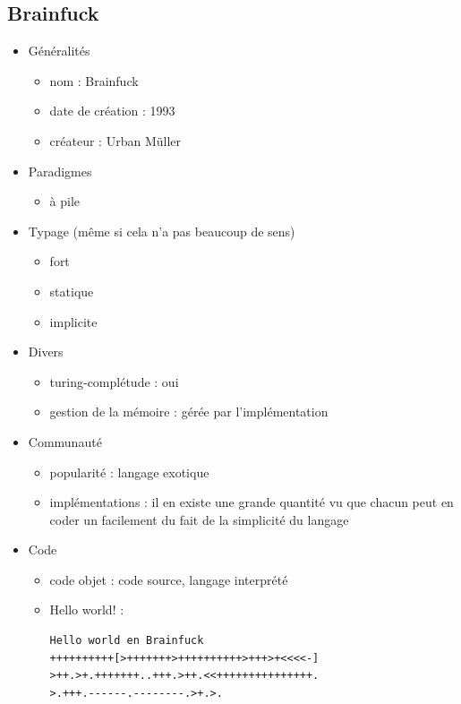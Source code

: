 \newpage

\subsection{Brainfuck}

\renewcommand{\labelitemi}{\textbullet}
\begin{itemize}
\item Généralités
	\begin{itemize}
	\item nom : Brainfuck
	\item date de création : 1993
	\item créateur : Urban Müller\\
	\end{itemize}
\item Paradigmes
	\begin{itemize}
	\item à pile\\
	\end{itemize}
\item Typage (même si cela n'a pas beaucoup de sens)
	\begin{itemize}
	\item fort
	\item statique
	\item implicite\\
	\end{itemize}
\item Divers
	\begin{itemize}
	\item turing-complétude : oui
	\item gestion de la mémoire : gérée par l'implémentation\\
	\end{itemize}
\item Communauté
	\begin{itemize}
	\item popularité : langage exotique
	\item implémentations : il en existe une grande quantité vu que chacun peut en coder un facilement du fait de la simplicité du langage\\
	\end{itemize}
\item Code
	\begin{itemize}
	\item code objet : code source, langage interprété
	\item Hello world! :
\begin{lstlisting}
Hello world en Brainfuck
++++++++++[>+++++++>++++++++++>+++>+<<<<-]
>++.>+.+++++++..+++.>++.<<+++++++++++++++.
>.+++.------.--------.>+.>.
\end{lstlisting}
	\end{itemize}
\end{itemize}
